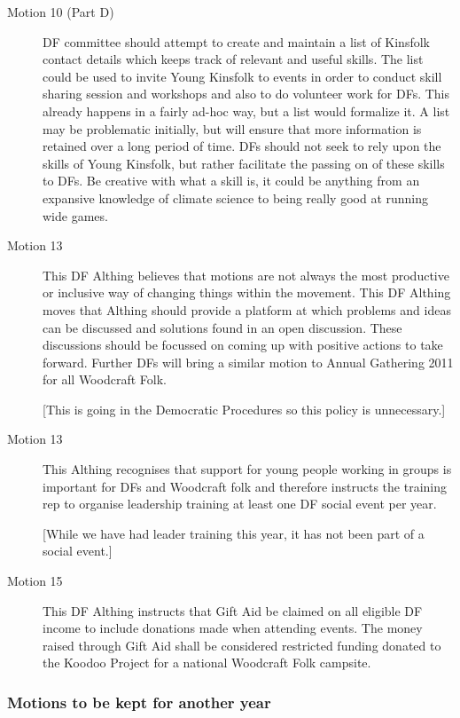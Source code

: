 \documentclass[a4paper, 11pt]{article} %
\begin{document}
\begin{description}
\item[Motion 10 (Part D)]  DF committee should attempt to create and maintain a list of Kinsfolk contact details which keeps track of relevant and useful skills.  The list could be used to invite Young Kinsfolk to events in order to conduct skill sharing session and workshops and also to do volunteer work for DFs.  This already happens in a fairly ad-hoc way, but a list would formalize it.  A list may be problematic initially, but will ensure that more information is retained over a long period of time.  DFs should not seek to rely upon the skills of Young Kinsfolk, but rather facilitate the passing on of these skills to DFs.  Be creative with what a skill is, it could be anything from an expansive knowledge of climate science to being really good at running wide games.

\item[Motion 13]  This DF Althing believes that motions are not always the most productive or inclusive way of
changing things within the movement. This DF Althing moves that Althing should provide a platform
at which problems and ideas can be discussed and solutions found in an open discussion. These
discussions should be focussed on coming up with positive actions to take forward. Further DFs will
bring a similar motion to Annual Gathering 2011 for all Woodcraft Folk.

[This is going in the Democratic Procedures so this policy is unnecessary.]

\item[Motion 13]  This Althing recognises that support for young people working in groups is important for DFs and Woodcraft folk and therefore instructs the training rep to organise leadership training at least one DF social event per year.

[While we have had leader training this year, it has not been part of a social event.]

\item[Motion 15]  This DF Althing instructs that Gift Aid be claimed on all eligible DF income to include donations made when attending events. The money raised through Gift Aid shall be considered restricted funding donated to the Koodoo Project for a national Woodcraft Folk campsite.
\end{description}

\subsubsection{Motions to be kept for another year}
\end{document}
